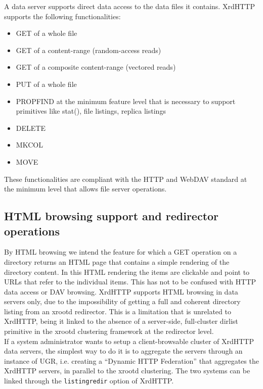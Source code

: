 \documentclass[12pt]{article} %
\begin{document}
A data server supports direct data access to the data files it contains. XrdHTTP supports the following functionalities:

\begin{itemize}
 \item GET of a whole file
 \item GET of a content-range (random-access reads)
 \item GET of a composite content-range (vectored reads)
 \item PUT of a whole file
 \item PROPFIND at the minimum feature level that is necessary to support primitives like stat(), file listings, replica listings
 \item DELETE
 \item MKCOL
 \item MOVE
\end{itemize}

These functionalities are compliant with the HTTP and WebDAV standard at the minimum level that allows file server operations. 


\subsection{HTML browsing support and redirector operations}

 By HTML browsing we intend the feature for which a GET operation on a directory returns an HTML page that contains a simple rendering of the directory content. In this HTML rendering the items are clickable and point to URLs that refer to the individual items. This has not to be confused with HTTP data access or DAV browsing. XrdHTTP supports HTML browsing in data servers only, due to the impossibility of getting a full and coherent directory listing from an xrootd redirector. This is a limitation that is unrelated to XrdHTTP, being it linked to the absence of a server-side, full-cluster dirlist primitive in the xrootd clustering framework at the redirector level.\\

 If a system administrator wants to setup a client-browsable cluster of XrdHTTP data servers, the simplest way to do it is to aggregate the servers through an instance of UGR, i.e. creating a ``Dynamic HTTP Federation'' that aggregates the XrdHTTP servers, in parallel to the xrootd clustering. The two systems can be linked through the \verb'listingredir' option of XrdHTTP.\\
\end{document}
